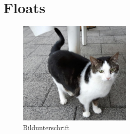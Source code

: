\section{Floats}

\begin{figure}[htpb]
\begin{center}
\includegraphics[width=0.5\textwidth]{../img/Dala}
\end{center}
\caption[Katze]{Bildunterschrift}
\label{img:katze} %
\end{figure}
